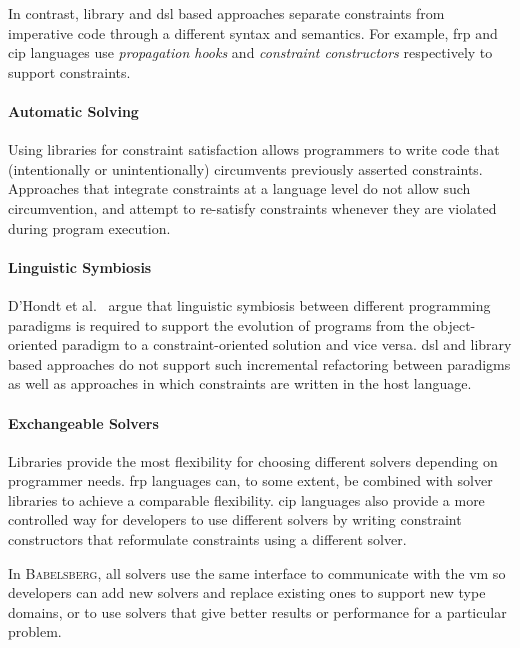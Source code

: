 \documentclass[english, inproceedings]{polze}
\newcommand{\ac}[1]{\gls{#1}}
\newcommand{\langname}{\textsc{Babelsberg}\xspace}
\begin{document}
In contrast, library and \ac{dsl} based approaches separate
constraints from imperative code through a different syntax and
semantics. For example, \ac{frp} and \ac{cip} languages use
\emph{propagation hooks} and \emph{constraint constructors}
respectively to support constraints.

\paragraph{Automatic Solving}
Using libraries for constraint satisfaction allows programmers to
write code that (intentionally or unintentionally) circumvents
previously asserted constraints. Approaches that integrate constraints
at a language level do not allow such circumvention, and attempt to
re-satisfy constraints whenever they are violated during program
execution.

\paragraph{Linguistic Symbiosis}
D'Hondt et al.~\cite{d2004seamless} argue that linguistic symbiosis
between different programming paradigms is required to support the
evolution of programs from the object-oriented paradigm to a
constraint-oriented solution and vice versa. \ac{dsl} and library
based approaches do not support such incremental refactoring between
paradigms as well as approaches in which constraints are written in the
host language.

\paragraph{Exchangeable Solvers}
Libraries provide the most flexibility for choosing different solvers
depending on programmer needs. \ac{frp} languages can, to some extent,
be combined with solver libraries to achieve a comparable
flexibility. \ac{cip} languages also provide a more controlled way for
developers to use different solvers by writing constraint constructors
that reformulate constraints using a different solver.

In \langname, all solvers use the same interface to communicate with
the \ac{vm} so developers can add new solvers and replace existing
ones to support new type domains, or to use solvers that give better
results or performance for a particular problem.
\end{document}
